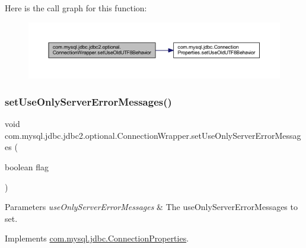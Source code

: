 Here is the call graph for this function\+:
\nopagebreak
\begin{figure}[H]
\begin{center}
\leavevmode
\includegraphics[width=350pt]{classcom_1_1mysql_1_1jdbc_1_1jdbc2_1_1optional_1_1_connection_wrapper_aa0de2a1679fb6e3d601d2bd55607d60a_cgraph}
\end{center}
\end{figure}
\mbox{\label{classcom_1_1mysql_1_1jdbc_1_1jdbc2_1_1optional_1_1_connection_wrapper_aeb0a18bb97912baf34e436f5a61e7233}} 
\subsubsection{\texorpdfstring{set\+Use\+Only\+Server\+Error\+Messages()}{setUseOnlyServerErrorMessages()}}
{\footnotesize\ttfamily void com.\+mysql.\+jdbc.\+jdbc2.\+optional.\+Connection\+Wrapper.\+set\+Use\+Only\+Server\+Error\+Messages (\begin{DoxyParamCaption}\item[{boolean}]{flag }\end{DoxyParamCaption})}


\begin{DoxyParams}{Parameters}
{\em use\+Only\+Server\+Error\+Messages} & The use\+Only\+Server\+Error\+Messages to set. \\
\hline
\end{DoxyParams}


Implements \mbox{\hyperlink{interfacecom_1_1mysql_1_1jdbc_1_1_connection_properties_a4d6983e3fcbf208b481c59edb1aa793b}{com.\+mysql.\+jdbc.\+Connection\+Properties}}.

